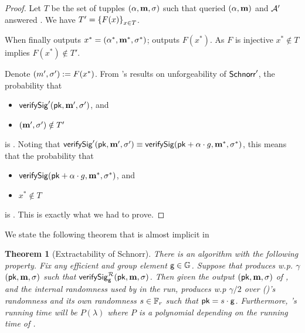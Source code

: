 \documentclass[11pt]{article}
\numberwithin{equation}{section} %
\numberwithin{figure}{section} %
\newtheorem{thm}{Theorem}[section]
\newcommand{\set}[1]{\ensuremath{\left\{#1\right\}}\xspace}
\begin{document}
\begin{proof}
Let $T$ be the set of tupples $(\alpha,\mathbf m,\sigma)$ such that \adv queried $(\alpha,\mathbf m)$ and ${\mathcal A}'$ answered \sig.
We have $T'= \sett{F(x)}{x\in T}$.

When \adv finally outputs $x^*=(\alpha^*,\mathbf m^*,\sigma^*)$;
\advprime outputs $F(x^*)$. 
As $F$ is injective $x^* \notin T$
implies $F(x^*)\notin T'$.

Denote $(m',\sigma'):= F(x^*)$.
From \cite{schnorrSecurity}'s results on unforgeability of $\mathsf{Schnorr}'$, the probability that 
\begin{itemize}
   \item $\mathsf{verifySig}'(\mathsf{pk},\mathbf m',\sigma')$, and 
   \item $(\mathbf m',\sigma')\notin T'$
\end{itemize}
is \negl.
Noting that $\mathsf{verifySig}'(\mathsf{pk},\mathbf m',\sigma')\equiv \mathsf{verifySig}(\mathsf{pk}+\alpha\cdot g, \mathbf m^*,\sigma^*)$,
this means that the probability that
\begin{itemize}
   \item $\mathsf{verifySig}(\mathsf{pk}+\alpha\cdot g,\mathbf m^*,\sigma^*)$, and 
   \item $x^* \notin T$
\end{itemize}
is \negl.
This is exactly what we had to prove.
\end{proof}


We state the following theorem that is almost implicit in \cite{PS00}
\begin{thm}[Extractability of Schnorr]\label{thm:extractSchnorr}
There is an algorithm \ext with the following property.
Fix any efficient \adv and group element $\mathsf{g}\in\mathbb{G}$. Suppose that \adv produces w.p. $\gamma$
$(\mathsf{pk},\mathbf m,\sigma)$ such that $\mathsf{verifySig}^{\mathcal R}_{\mathsf{g}}(\mathsf{pk},\mathbf m,\sigma)$.
Then given the output $(\mathsf{pk},\mathbf m,\sigma)$ of \adv, and the internal randomness used by \adv in the run,
\ext produces w.p $\gamma/2$ over (\adv)'s randomness and its own randomness $s\in{\mathbb F}_r$ such that
$\mathsf{pk} = s\cdot \mathsf{g}$.
Furthermore, \ext's running time will be $P(\lambda)$ where $P$ is a polynomial depending on the running time of \adv.
\end{thm}

 
\end{document}
